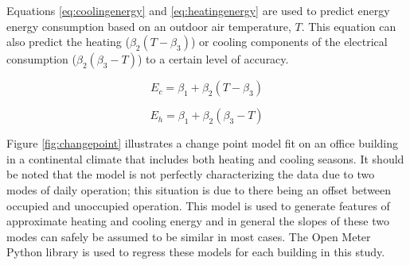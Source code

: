 Equations \ref{eq:coolingenergy} and \ref{eq:heatingenergy} are used to predict energy energy consumption based on an outdoor air temperature, $T$. This equation can also predict the heating ($\beta_2(T - \beta_3)$) or cooling components of the electrical consumption ($\beta_2(\beta_3 - T)$) to a certain level of accuracy. 

\begin{equation}
\label{eq:coolingenergy}
E_c = \beta_1 + \beta_2(T - \beta_3)
\end{equation}

\begin{equation}
\label{eq:heatingenergy}
E_h = \beta_1 + \beta_2(\beta_3 - T)
\end{equation}

Figure \ref{fig:changepoint} illustrates a change point model fit on an office building in a continental climate that includes both heating and cooling seasons. It should be noted that the model is not perfectly characterizing the data due to two modes of daily operation; this situation is due to there being an offset between occupied and unoccupied operation. This model is used to generate features of approximate heating and cooling energy and in general the slopes of these two modes can safely be assumed to be similar in most cases. The Open Meter Python library is used to regress these models for each building in this study.